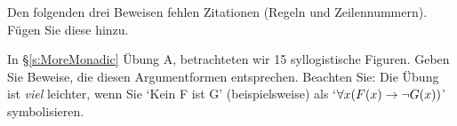 \problempart 
\label{pr.justifyFOLproof}
Den folgenden drei Beweisen fehlen Zitationen (Regeln und Zeilennummern). Fügen Sie diese hinzu.
\begin{earg}
\item \begin{fitchproof}
	\open
	\close
{} {}
\end{fitchproof}

\item \begin{fitchproof}
 {}
 {}
\end{fitchproof}

\item \begin{fitchproof}
\open
\close
{}
\end{fitchproof}
\end{earg}

\problempart
\label{pr.BarbaraEtc.proof1}
In \S\ref{s:MoreMonadic} Übung A, betrachteten wir 15 syllogistische Figuren. Geben Sie Beweise, die diesen Argumentformen entsprechen. Beachten Sie: Die Übung ist \emph{viel} leichter, wenn Sie `Kein F ist G' (beispielsweise) als `$\forall x (\mathord{F}(x) \rightarrow \neg \mathord{G}(x))$' symbolisieren.

\

